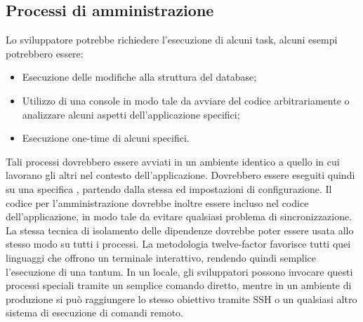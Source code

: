 \documentclass[PianoDiQualifica.tex]{subfiles}
\begin{document}
\subsection{Processi di amministrazione}
Lo sviluppatore potrebbe richiedere l'esecuzione di alcuni task, alcuni esempi potrebbero essere:
\begin{itemize}
\item Esecuzione delle modifiche alla struttura del database;
\item Utilizzo di una console in modo tale da avviare del codice arbitrariamente o analizzare alcuni aspetti dell'applicazione specifici;
\item Esecuzione one-time di alcuni  specifici.
\end{itemize}
Tali processi dovrebbero essere avviati in un ambiente identico a quello in cui lavorano gli altri nel contesto dell'applicazione. Dovrebbero essere eseguiti quindi su una specifica , partendo dalla stessa  ed impostazioni di configurazione. Il codice per l'amministrazione dovrebbe inoltre essere incluso nel codice dell'applicazione, in modo tale da evitare qualsiasi problema di sincronizzazione.
La stessa tecnica di isolamento delle dipendenze dovrebbe poter essere usata allo stesso modo su tutti i processi.
La metodologia twelve-factor favorisce tutti quei linguaggi che offrono un terminale interattivo, rendendo quindi semplice l'esecuzione di  una tantum. In un  locale, gli sviluppatori possono invocare questi processi speciali tramite un semplice comando diretto, mentre in un ambiente di produzione si può raggiungere lo stesso obiettivo tramite SSH o un qualsiasi altro sistema di esecuzione di comandi remoto.
\end{document}
